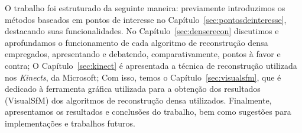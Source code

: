 O trabalho foi estruturado da seguinte maneira: previamente introduzimos os métodos baseados em pontos de interesse no Capítulo~\ref{sec:pontosdeinteresse}, destacando suas funcionalidades. No Capítulo~\ref{sec:denserecon} discutimos e aprofundamos o  funcionamento de cada algoritmo de reconstrução densa empregados, apresentando e debatendo, comparativamente, pontos à favor e contra; O Capítulo~\ref{sec:kinect} é apresentada a técnica de reconstrução utilizada nos  {\it Kinects}, da Microsoft; Com isso, temos o  Capítulo~\ref{sec:visualsfm}, que é dedicado à ferramenta gráfica utilizada para a obtenção dos resultados (VisualSfM) dos algoritmos de reconstrução densa utilizados. Finalmente, apresentamos os resultados e conclusões do trabalho, bem como sugestões para implementações e trabalhos futuros.


